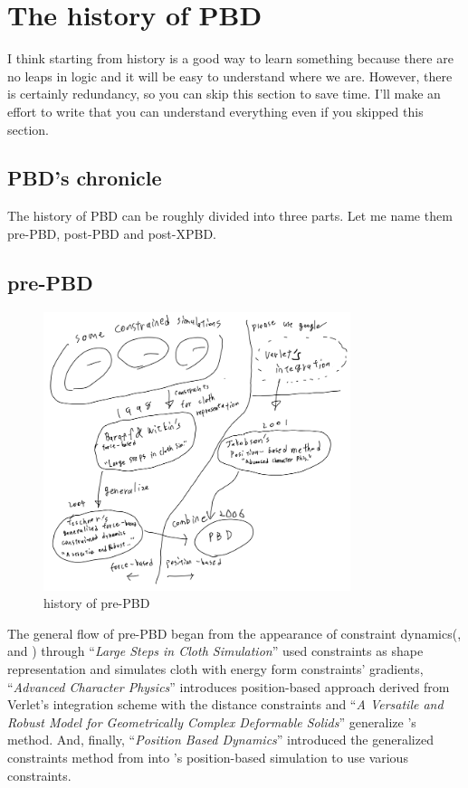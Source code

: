 \documentclass[pdflatex,sn-mathphys-num]{sn-jnl}%
\theoremstyle{thmstyleone}%
\theoremstyle{thmstyletwo}%
\theoremstyle{thmstylethree}%
\newcommand{\pname}[1]{``{\sl #1}''}
\begin{document}
\section{The history of PBD}
I think starting from history is a good way to learn something because there are no leaps in logic and it will be easy to understand where we are. However, there is certainly redundancy, so you can skip this section to save time. I'll make an effort to write that you can understand everything even if you skipped this section.
\subsection{PBD's chronicle}
The history of PBD can be roughly divided into three parts.
Let me name them pre-PBD, post-PBD and post-XPBD.

\subsection{pre-PBD}
\begin{figure}[h]
\centering
\label{prePBD}
\includegraphics[width=0.8\textwidth]{prePBD.png}
\caption{history of pre-PBD}
\end{figure}

The general flow of pre-PBD began from the appearance of constraint dynamics(\cite{EnergyWitkin1987}, \cite{ConstrainedBarzel} and \cite{ConstrainedPlatt}) through \pname{Large Steps in Cloth Simulation}\cite{LargeStepBaraff} used \gls{constraint}s as shape representation and simulates cloth with energy form \gls{constraint}s' gradients, \pname{Advanced Character Physics}\cite{Jakobsen2003AdvancedCP} introduces position-based approach derived from Verlet's integration scheme with the distance constraints and \pname{A Versatile and Robust Model for Geometrically Complex Deformable Solids}\cite{VersatileTeschner} generalize \cite{LargeStepBaraff}'s method.
And, finally, \pname{Position Based Dynamics}\cite{PBD} introduced the generalized constraints method from \cite{VersatileTeschner} into \cite{Jakobsen2003AdvancedCP}'s position-based simulation to use various \gls{constraint}s.
\end{document}
